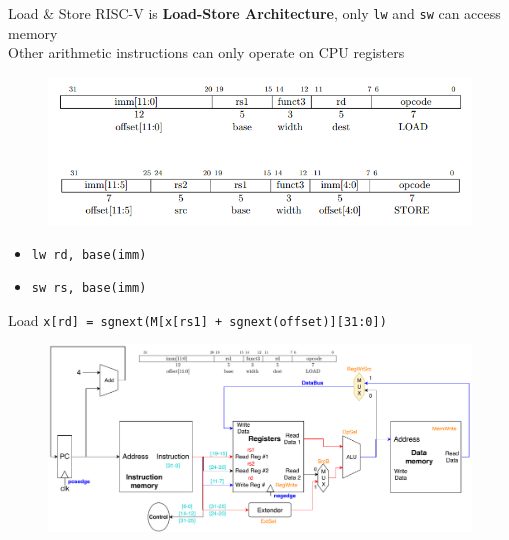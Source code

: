 \documentclass{myslide}
\begin{document}
\begin{frame}[fragile]{Load \& Store}
RISC-V is \textbf{Load-Store Architecture}, only \verb'lw' and \verb'sw' can access memory\\
Other arithmetic instructions can only operate on CPU registers
\begin{figure}
\centering
\includegraphics[width=\linewidth]{fig/Lecture2/lw-sw.PNG}
\end{figure}
\begin{itemize}
	\item \verb'lw rd, base(imm)'
	\item \verb'sw rs, base(imm)'
\end{itemize}
\end{frame}

\begin{frame}[fragile]{Load}
\verb'x[rd] = sgnext(M[x[rs1] + sgnext(offset)][31:0])'
\begin{figure}
\centering
\includegraphics[width=\linewidth]{fig/Lecture2/Datapath-lw.pdf}
\end{figure}
\end{frame}
\end{document}

